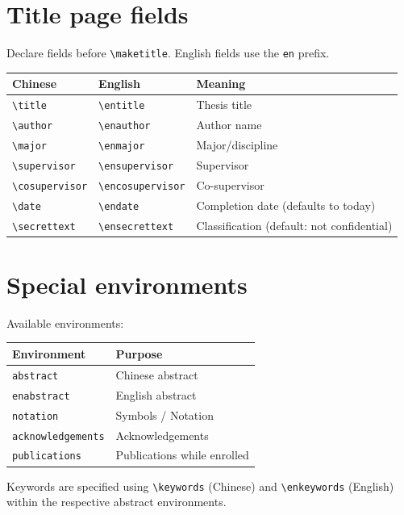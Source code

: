 \documentclass[12pt]{article}
\begin{document}
\section{Title page fields}
Declare fields before \lstinline|\maketitle|. English fields use the \texttt{en} prefix.
\begin{center}
\begin{tabular}{@{}lll@{}}
\toprule
Chinese & English & Meaning\\
\midrule
\verb|\title| & \verb|\entitle| & Thesis title\\
\verb|\author| & \verb|\enauthor| & Author name\\
\verb|\major| & \verb|\enmajor| & Major/discipline\\
\verb|\supervisor| & \verb|\ensupervisor| & Supervisor\\
\verb|\cosupervisor| & \verb|\encosupervisor| & Co-supervisor\\
\verb|\date| & \verb|\endate| & Completion date (defaults to today)\\
\verb|\secrettext| & \verb|\ensecrettext| & Classification (default: not confidential)\\
\bottomrule
\end{tabular}
\end{center}

\section{Special environments}
Available environments:
\begin{center}
\begin{tabular}{@{}ll@{}}
\toprule
Environment & Purpose\\
\midrule
\verb|abstract| & Chinese abstract\\
\verb|enabstract| & English abstract\\
\verb|notation| & Symbols / Notation\\
\verb|acknowledgements| & Acknowledgements\\
\verb|publications| & Publications while enrolled\\
\bottomrule
\end{tabular}
\end{center}
Keywords are specified using \verb|\keywords| (Chinese) and \verb|\enkeywords| (English) within the respective abstract environments.
\end{document}
